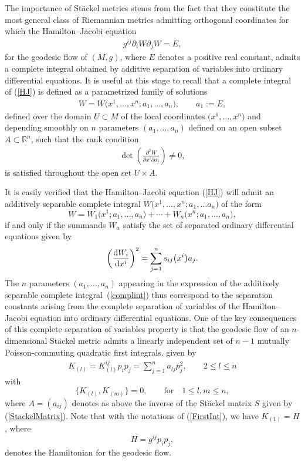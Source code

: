 The importance of St\"ackel metrics stems from the fact that they constitute the most general class of Riemannian metrics admitting orthogonal coordinates for which the Hamilton--Jacobi equation
\begin{gather}\label{HJ}
g^{ij}\partial_{i}W\partial_{j}W=E,
\end{gather}
for the geodesic flow of $(M,g)$, where $E$ denotes a positive real constant, admits a complete integral obtained by additive separation of variables into ordinary differential equations. It is useful at this stage to recall that a complete integral of (\ref{HJ}) is defined as a parametrized family of solutions
\begin{gather}\label{complint}
W=W\big(x^{1},\dots,x^{n};a_{1},\dots,a_{n}\big),\qquad a_{1}:=E,
\end{gather}
defined over the domain $U\subset M$ of the local coordinates $\big(x^{1},\dots,x^{n}\big)$ and depending smoothly on $n$ parameters $(a_{1},\dots,a_{n})$ defined on an open subset $A\subset {\mathbb{R}}^{n}$, such that the rank condition
\begin{gather*}%
\det \left(\frac{\partial^{2}W}{\partial x^{i}\partial a_{j}}\right) \neq 0,
\end{gather*}
is satisfied throughout the open set $U\times A$.

It is easily verified that the Hamilton--Jacobi equation (\ref{HJ}) will admit an additively separable complete integral $W\big(x^{1},\dots, x^{n};a_{1},\dots a_{n}\big)$ of the form
\[
W=W_{1}\big(x^{1};a_{1},\dots, a_{n}\big)+\cdots+W_{n}\big(x^{n};a_{1},\dots, a_{n}\big),
\]
if and only if the summands $W_{\alpha}$ satisfy the set of separated ordinary differential equations given by
\[
\left(\frac{{\rm d}W_{i}}{{\rm d}x^{i}}\right)^{2}=\sum_{j=1}^{n}s_{ij}\big(x^{i}\big)a_{j}.
\]
The $n$ parameters $(a_{1},\dots , a_{n})$ appearing in the expression of the additively separable complete integral~(\ref{complint}) thus correspond to the separation constants arising from the complete separation of variables of the Hamilton--Jacobi equation into ordinary differential equations.
One of the key consequences of this complete separation of variables property is that the geodesic flow of an $n$-dimensional St\"ackel metric admits a linearly independent set of $n-1$ mutually Poisson-commuting quadratic first integrals, given by
\begin{gather}\label{FirstInt}
K_{(l)} = K_{(l)}^{ij} p_i p_j = \sum_{j=1}^{n}a_{lj} p_{j}^{2}, \qquad 2\leq l \leq n
\end{gather}
with
\[ \big\{K_{(l)},K_{(m)}\big\}=0,\qquad \text{for} \quad 1\leq l,m \leq n,
\]
where $A=(a_{ij})$ denotes as above the inverse of the St\"ackel matrix $S$ given by (\ref{StackelMatrix}). Note that with the notations of (\ref{FirstInt}), we have $K_{(1)}=H$, where
\[
H=g^{ij}p_{i}p_{j},
\]
denotes the Hamiltonian for the geodesic flow.

